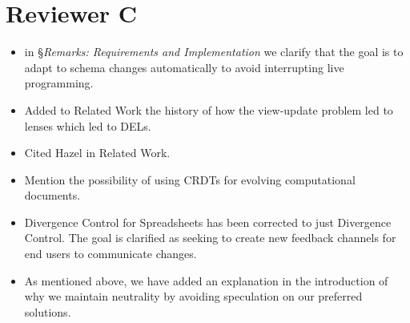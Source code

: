 \documentclass{article}
\begin{document}
\section{Reviewer C}
\begin{itemize}
  \item in \S\emph{Remarks: Requirements and Implementation} we clarify that the goal is to adapt to schema changes automatically to avoid interrupting live programming.

  \item Added to Related Work the history of how the view-update problem led to lenses which led to DELs.

  \item Cited Hazel in Related Work.

  \item Mention the possibility of using CRDTs for evolving computational documents.

  \item Divergence Control for Spreadsheets has been corrected to just Divergence Control. The goal is clarified as seeking to create new feedback channels for end users to communicate changes.

  \item As mentioned above, we have added an explanation in the introduction of why we maintain neutrality by avoiding speculation on our preferred solutions.
\end{itemize}
\end{document}
